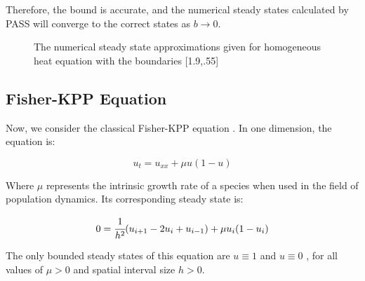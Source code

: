 \documentclass[11pt]{article}
\begin{document}
Therefore, the bound is accurate, and the numerical steady states calculated by PASS will converge to the correct states as $b \rightarrow 0$.

\begin{figure*}
\begin{center}
\caption{The numerical steady state approximations given for homogeneous heat equation with the boundaries [1.9,.55]}
\label{heats}
\end{center}
\end{figure*}

\subsection{Fisher-KPP Equation}

Now, we consider the classical Fisher-KPP equation \citep{Fisher}. In one dimension, the equation is:

\begin{equation}
    \label{Fisher}
    u_t = u_{xx} + \mu u (1-u)
\end{equation}

\noindent Where $\mu$ represents the intrinsic growth rate of a species \citep{Numerical_RD_1} when used in the field of population dynamics. Its corresponding steady state is:

\begin{equation}
    \label{discrete Fisher}
    0 = \cfrac{1}{h^2} (u_{i+1} - 2u_i + u_{i-1}) + \mu u_i (1-u_i)
\end{equation}

\noindent The only bounded steady states of this equation are $u \equiv 1$ and $u \equiv 0$ \citep{Fisher}, for all values of $\mu > 0$ and spatial interval size $h > 0$.
\end{document}
